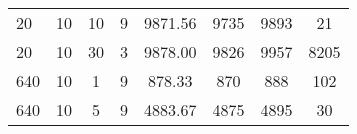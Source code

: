 \begin{table}[H]
\begin{tabular}{l|ccccccc}
 20                                                                   & 10                                                                                                                                                             & 10                                                                                                                               & 9                                                                                                                                                              & 9871.56                                                                                                                          & 9735                         & 9893                         & 21                                                                   \\
 20                                                                   & 10                                                                                                                                                             & 30                                                                                                                               & 3                                                                                                                                                              & 9878.00                                                                                                                          & 9826                         & 9957                         & 8205                                                                 \\
 640                                                                  & 10                                                                                                                                                             & 1                                                                                                                                & 9                                                                                                                                                              & 878.33                                                                                                                           & 870                          & 888                          & 102                                                                  \\
 640                                                                  & 10                                                                                                                                                             & 5                                                                                                                                & 9                                                                                                                                                              & 4883.67                                                                                                                          & 4875                         & 4895                         & 30                                                                   \\

\end{tabular}
\end{table}
